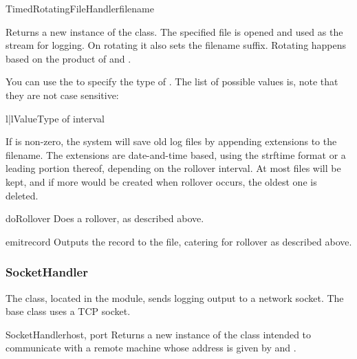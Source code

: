 \begin{classdesc}{TimedRotatingFileHandler}{filename
                                            }

Returns a new instance of the  class. The
specified file is opened and used as the stream for logging. On rotating
it also sets the filename suffix. Rotating happens based on the product
of  and .

You can use the  to specify the type of . The
list of possible values is, note that they are not case sensitive:

\begin{tableii}{l|l}{}{Value}{Type of interval}
\end{tableii}

If  is non-zero, the system will save old log files by
appending extensions to the filename. The extensions are date-and-time
based, using the strftime format  or a leading
portion thereof, depending on the rollover interval. At most 
files will be kept, and if more would be created when rollover occurs, the
oldest one is deleted.
\end{classdesc}

\begin{methoddesc}{doRollover}{}
Does a rollover, as described above.
\end{methoddesc}

\begin{methoddesc}{emit}{record}
Outputs the record to the file, catering for rollover as described
above.
\end{methoddesc}

\subsubsection{SocketHandler}

The  class, located in the
 module, sends logging output to a network
socket. The base class uses a TCP socket.

\begin{classdesc}{SocketHandler}{host, port}
Returns a new instance of the  class intended to
communicate with a remote machine whose address is given by 
and .
\end{classdesc}

